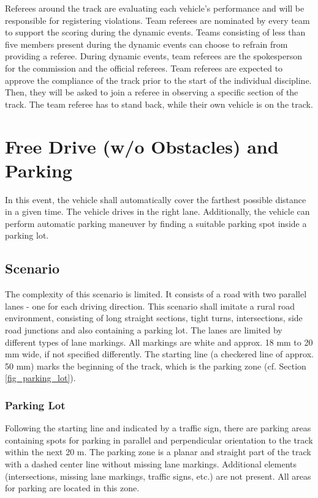 \documentclass[a4paper]{report}
\begin{document}
Referees around the track are evaluating each vehicle’s performance and will be
responsible for registering violations. Team referees are nominated by every
team to support the scoring during the dynamic events. Teams consisting of less
than five members present during the dynamic events can choose to refrain from
providing a referee. During dynamic events, team referees are the spokesperson
for the commission and the official referees. Team referees are expected to
approve the compliance of the track prior to the start of the individual
discipline. Then, they will be asked to join a referee in observing a specific
section of the track. The team referee has to stand back, while their own
vehicle is on the track.

\section{Free Drive (w/o Obstacles) and Parking}

In this event, the vehicle shall automatically cover the farthest possible
distance in a given time. The vehicle drives in the right lane. Additionally,
the vehicle can perform automatic parking maneuver by finding a suitable
parking spot inside a parking lot.

\subsection{Scenario}

The complexity of this scenario is limited. It consists of a road with two
parallel lanes - one for each driving direction. This scenario shall imitate a
rural road environment, consisting of long straight sections, tight turns,
intersections, side road junctions and also containing a parking lot. The lanes
are limited by different types of lane markings. All markings are white and
approx. 18 mm to 20 mm wide, if not specified differently. The starting line (a
checkered line of approx. 50 mm) marks the beginning of the track, which is the
parking zone (cf. Section \ref{fig_parking_lot}).

\subsubsection{Parking Lot}

Following the starting line and indicated by a traffic sign, there are parking
areas containing spots for parking in parallel and perpendicular orientation to
the track within the next 20 m. The parking zone is a planar and straight part
of the track with a dashed center line without missing lane markings.
Additional elements (intersections, missing lane markings, traffic signs, etc.)
are not present. All areas for parking are located in this zone.
\end{document}
